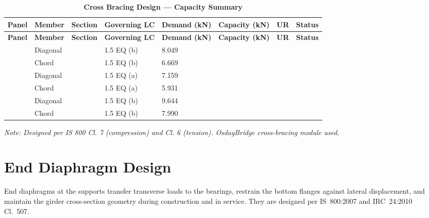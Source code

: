 \documentclass[12pt,a4paper]{report}
\numberwithin{table}{chapter}
\numberwithin{figure}{chapter}
\begin{document}
\vspace{1em}
\begin{longtable}{|C{2.0cm}|L{1.8cm}|C{2.2cm}|C{3.0cm}|C{1.8cm}|C{1.8cm}|C{1.2cm}|C{1.8cm}|}
\caption{\textbf{Cross Bracing Design --- Capacity Summary}}
\hline
\textbf{Panel} & \textbf{Member} & \textbf{Section} & \textbf{Governing LC} & \textbf{Demand (kN)} & \textbf{Capacity (kN)} & \textbf{UR} & \textbf{Status} \\[6pt]
\hline

\endfirsthead
\hline
\textbf{Panel} & \textbf{Member} & \textbf{Section} & \textbf{Governing LC} & \textbf{Demand (kN)} & \textbf{Capacity (kN)} & \textbf{UR} & \textbf{Status} \\[6pt]
\hline
\endhead
{} & Diagonal &  & 1.5 EQ (b) & 8.049 &  &  &  \\[6pt]
 & Chord &  & 1.5 EQ (b) & 6.669 &  &  &  \\[6pt]
\hline
{} & Diagonal &  & 1.5 EQ (a) & 7.159 &  &  &  \\[6pt]
 & Chord &  & 1.5 EQ (a) & 5.931 &  &  &  \\[6pt]
\hline
{} & Diagonal &  & 1.5 EQ (b) & 9.644 &  &  &  \\[6pt]
 & Chord &  & 1.5 EQ (b) & 7.990 &  &  &  \\[6pt]
\hline
\end{longtable}
\noindent\textit{Note: Designed per IS 800 Cl. 7 (compression) and Cl. 6 (tension). OsdagBridge cross-bracing module used.}

\section{End Diaphragm Design}
\label{sec:end-diaphragm}

End diaphragms at the supports transfer transverse loads to the bearings, restrain the bottom flanges against lateral displacement, and maintain the girder cross-section geometry during construction and in service. They are designed per IS~800:2007 and IRC~24:2010 Cl.~507.

\vspace{1em}

\vspace{0.4em}
\noindent
\setlength{\tabcolsep}{4pt}
\setlength{\LTleft}{0pt}
\setlength{\LTright}{\fill}
\end{document}
